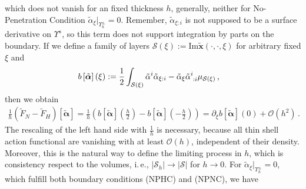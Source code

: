 \documentclass[a4paper,10pt]{scrartcl}
\newcommand{\surf}{\mathcal{S}}
\newcommand{\surfh}{\surf_{h}}
\newcommand{\landau}{\mathcal{O}}
\newcommand{\xb}{\mathbf{x}}
\newcommand{\txb}{\tilde{\xb}}
\newcommand{\alphab}{\bm{\alpha}}
\newcommand{\talphab}{\tilde{\alphab}}
\newcommand{\talpha}{\tilde{\alpha}}
\newcommand{\tF}{\tilde{F}}
\newcommand{\boundary}[1]{\Upsilon_{h}^{#1}}
\newcommand{\AtBoundary}[1]{\big|_{\boundary{#1}}}
\newcommand{\formComma}{\,\text{,}}
\newcommand{\formPeriod}{\,\text{.}}
\newcommand{\ie}{i.\,e.}%
\begin{document}
    which does not vanish for an fixed thickness \( h \), generally, neither for No-Penetration Condition \(\talpha_{\xi}\AtBoundary{\pm} = 0  \).
    Remember, \( \talpha_{\xi:i} \) is not supposed to be a surface derivative on \( \Upsilon^{s} \), 
    so this term does not support integration by parts on the boundary.
    If we define a family of layers \( \surf(\xi) := \text{Im}\txb(\cdot,\cdot,\xi) \) for arbitrary fixed \( \xi \) and
    \begin{align}
      b\left[ \talphab \right]\left( \xi \right) &:= \frac{1}{2}\int_{\surf(\xi)} \talpha^{i} \talpha_{\xi:i} - \talpha_{\xi}\tensor{\talpha}{^{i}_{:i}} \mu_{\surf(\xi)}\formComma
    \end{align}
    then we obtain
    \begin{align}
      \frac{1}{h}\left( \tF_{N} - \tF_{H} \right)\left[ \talphab \right]
          = \frac{1}{h}\left( b\left[ \talphab \right]\left( \frac{h}{2} \right) -  b\left[ \talphab \right]\left( -\frac{h}{2} \right)\right)
          = \partial_{\xi}  b\left[ \talphab \right]\left( 0 \right) + \landau(h^{2})\formPeriod
    \end{align}
    The rescaling of the left hand side with \( \frac{1}{h} \) is necessary, because all thin shell action functional are vanishing with at least \( \landau(h) \),
    independent of their density.
    Moreover, this is the natural way to define the limiting process in \( h \), which is consistency respect to the volumes,
    \ie, \( |\surfh|\rightarrow|\surf| \) for \( h\rightarrow 0 \).
    For \(\talpha_{\xi}\AtBoundary{\pm} = 0  \), which fulfill both boundary conditions (NPHC) and (NPNC), we have
\end{document}
